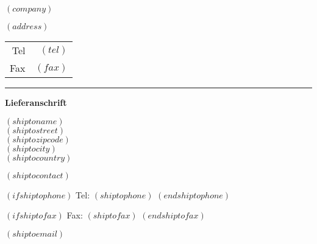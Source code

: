 \documentclass[twoside]{scrartcl}
\begin{document}
\newlength{\descrwidth}\setlength{\descrwidth}{9cm}
\fontsize{10pt}{12pt}\selectfont

\pagestyle{myheadings}
\thispagestyle{empty}

\vspace*{-1.3cm}

\parbox{\textwidth}{
  \parbox[b]{.42\textwidth}{
    $(company)$

    $(address)$
  }\hfill
  \begin{tabular}[b]{rr@{}}
  Tel & $(tel)$\\
  Fax & $(fax)$
  \end{tabular}

  \rule[1.5ex]{\textwidth}{0.5pt}
}





\vspace*{-12pt}



\vspace*{0.5cm}

\parbox[t]{1cm}{\hfill}
\parbox[t]{.5\textwidth}{
  \textbf{Lieferanschrift}
} \hfill

\vspace{0.7cm}

\parbox[t]{1cm}{\hfill}
\parbox[t]{.5\textwidth}{

$(shiptoname)$ \\
$(shiptostreet)$ \\
$(shiptozipcode)$ \\
$(shiptocity)$ \\
$(shiptocountry)$
}
\parbox[t]{.4\textwidth}{
  $(shiptocontact)$

  $(if shiptophone)$
  Tel: $(shiptophone)$
  $(end shiptophone)$

  $(if shiptofax)$
  Fax: $(shiptofax)$
  $(end shiptofax)$

  $(shiptoemail)$
}
\hfill

\vspace{1cm}
\end{document}

